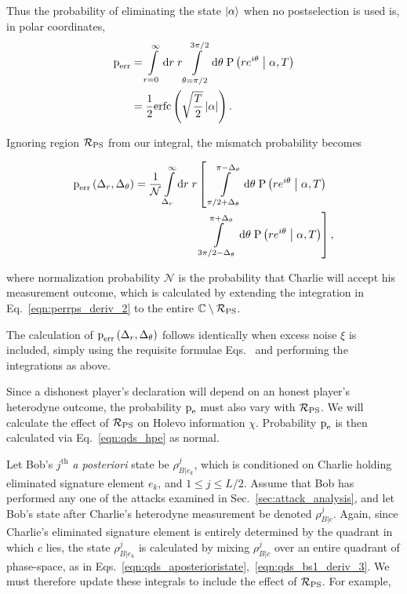 \noindent Thus the probability of eliminating the state $\ket{\alpha}$ when no postselection is used is, in polar coordinates,
\begin{align}
\perr &= \int\limits_{r=0}^\infty \mathrm{d}r \; r \int\limits_{\theta = \pi/2}^{3 \pi/2} \mathrm{d}\theta \; \text{P}\left(r e^{i \theta} \given \alpha, T\right) \notag \\
%
&= \frac{1}{2}\erfc\left(\sqrt{\frac{T}{2}}\left|\alpha\right|\right).
\end{align}

\noindent Ignoring region $\mathcal{R}_{\text{PS}}$ from our integral, the mismatch probability becomes

\begin{align}\label{eqn:perrps_deriv_2}
\perr\left(\Delta_r, \Delta_\theta\right) = \frac{1}{\mathcal{N}} \int\limits_{\Delta_r}^{\infty} \mathrm{d}r \; r &\left[ \; \int\limits_{ \pi/2 + \Delta_\theta}^{\pi - \Delta_\theta} \mathrm{d}\theta \; \text{P}\left(r e^{i \theta} \given \alpha, T\right) \right. \notag \\
%
&\left. \int\limits_{3 \pi/2 - \Delta_\theta}^{\pi + \Delta_\theta} \mathrm{d}\theta \; \text{P}\left(r e^{i \theta} \given \alpha, T\right) \right],
\end{align}

\noindent where normalization probability $\mathcal{N}$ is the probability that Charlie will accept his measurement outcome, which is calculated by extending the integration in Eq.~\ref{eqn:perrps_deriv_2} to the entire $\mathbb{C} \setminus \mathcal{R}_{\text{PS}}$.

The calculation of $\text{p}_{\text{err}}\left(\Delta_r, \Delta_\theta\right)$ follows identically when excess noise $\xi$ is included, simply using the requisite formulae Eqs.~ and performing the integrations as above. 


Since a dishonest player's declaration will depend on an honest player's heterodyne outcome, the probability $\text{p}_{\text{e}}$ must also vary with $\mathcal{R}_{\text{PS}}$. We will calculate the effect of $\mathcal{R}_{\text{PS}}$ on Holevo information $\chi$. Probability $\text{p}_{\text{e}}$ is then calculated via Eq.~\ref{eqn:qds_hpe} as normal.

Let Bob's $j^{\text{th}}$ \emph{a posteriori} state be $\rho_{B | e_k}^j$, which is conditioned on Charlie holding eliminated signature element $e_k$, and $1\le j \le L/2$. Assume that Bob has performed any one of the attacks examined in Sec.~\ref{sec:attack_analysis}, and let Bob's state after Charlie's heterodyne measurement be denoted $\rho_{B | c}^j$. Again, since Charlie's eliminated signature element is entirely determined by the quadrant in which $c$ lies, the state $\rho_{B | e_k}^j$ is calculated by mixing $\rho_{B | c}^j$ over an entire quadrant of phase-space, as in Eqs.~\ref{eqn:qds_aposterioristate},~\ref{eqn:qds_bs1_deriv_3}. We must therefore update these integrals to include the effect of $\mathcal{R}_{\text{PS}}$. For example,

